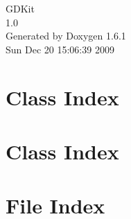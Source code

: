 \documentclass[a4paper]{book}
\begin{document}
\hypersetup{pageanchor=false}
\begin{titlepage}
\vspace*{7cm}
\begin{center}
{\Large GDKit \\[1ex]\large 1.0 }\\
\vspace*{1cm}
{\large Generated by Doxygen 1.6.1}\\
\vspace*{0.5cm}
{\small Sun Dec 20 15:06:39 2009}\\
\end{center}
\end{titlepage}
\clearemptydoublepage
{}
\tableofcontents
\clearemptydoublepage
{}
\hypersetup{pageanchor=true}
\chapter{Class Index}

\chapter{Class Index}

\chapter{File Index}

\end{document}
